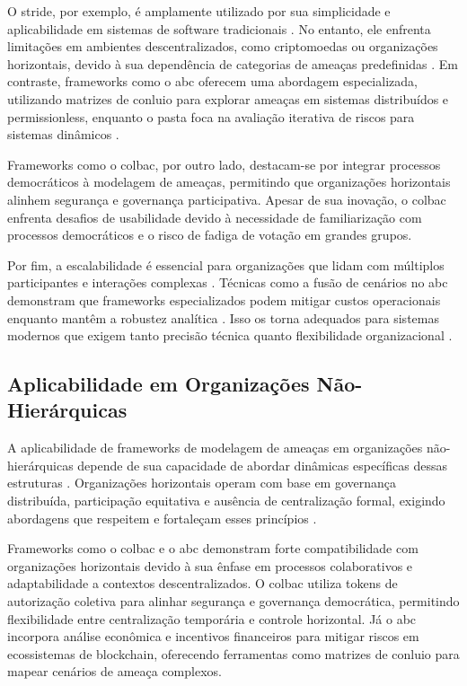 O \gls{stride}, por exemplo, é amplamente utilizado por sua simplicidade e
aplicabilidade em sistemas de software tradicionais
\cite{ThreatModelingdesigningForSecurity}. No entanto, ele
enfrenta limitações em ambientes descentralizados, como criptomoedas
ou organizações horizontais, devido à sua dependência de categorias de
ameaças predefinidas \cite{STRIDEthreatmodelingforcyberphysical}.
Em contraste, frameworks como o \gls{abc} oferecem uma abordagem especializada,
utilizando matrizes de conluio para explorar ameaças em
sistemas distribuídos e permissionless, enquanto o \gls{pasta} foca na
avaliação iterativa de riscos para sistemas dinâmicos
\cite{AbcCrypto, RiskCentricThreatModeling}.

Frameworks como o \gls{colbac}, por outro lado, destacam-se por integrar
processos democráticos à modelagem de ameaças, permitindo que
organizações horizontais alinhem segurança e governança participativa.
Apesar de sua inovação, o \gls{colbac} enfrenta desafios de usabilidade
devido à necessidade de familiarização com processos democráticos e o
risco de fadiga de votação em grandes grupos.

Por fim, a escalabilidade é essencial para organizações que lidam com
múltiplos participantes e interações complexas \cite{AbcCrypto}.
Técnicas como a fusão de cenários no \gls{abc} demonstram que frameworks especializados
podem mitigar custos operacionais enquanto mantêm a robustez
analítica \cite{AbcCrypto}. Isso os torna adequados para sistemas modernos que exigem
tanto precisão técnica quanto flexibilidade organizacional \cite{Colbac}.

\subsection{Aplicabilidade em Organizações Não-Hierárquicas}
\label{subsec:applicability_non_hierarchical}

A aplicabilidade de frameworks de modelagem de ameaças em organizações
não-hierárquicas depende de sua capacidade de abordar dinâmicas
específicas dessas estruturas \cite{Colbac, ThreatModelingASystematicLiteratureReview}.
Organizações horizontais operam com base em governança distribuída,
participação equitativa e ausência de centralização formal,
exigindo abordagens que respeitem e fortaleçam esses princípios \cite{EverydayRevolutions}.

Frameworks como o \gls{colbac} e o \gls{abc} demonstram forte
compatibilidade com organizações horizontais devido à sua ênfase em
processos colaborativos e adaptabilidade a contextos descentralizados.
O  \gls{colbac} utiliza tokens de autorização coletiva para alinhar segurança
e governança democrática, permitindo flexibilidade entre centralização
temporária e controle horizontal. Já o \gls{abc} incorpora análise
econômica e incentivos financeiros para mitigar riscos em ecossistemas
de blockchain, oferecendo ferramentas como matrizes de conluio para
mapear cenários de ameaça complexos.

